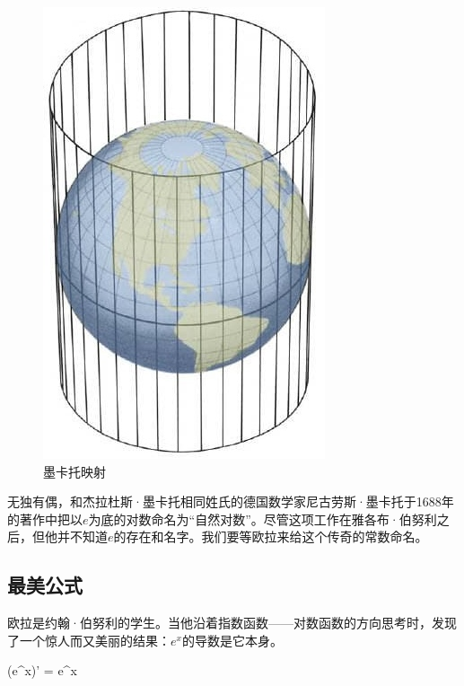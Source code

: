 \documentclass[b5paper]{ctexart}
\begin{document}
\begin{figure}[htbp]
 \centering
 \includegraphics[scale=0.3]{img/mercator-map}
 \caption{墨卡托映射}
 \label{fig:mercator}
\end{figure}

无独有偶，和杰拉杜斯·墨卡托相同姓氏的德国数学家尼古劳斯·墨卡托于1688年的著作中把以$e$为底的对数命名为“自然对数”。尽管这项工作在雅各布·伯努利之后，但他并不知道$e$的存在和名字。我们要等欧拉来给这个传奇的常数命名。

\subsection{最美公式}

欧拉是约翰·伯努利的学生。当他沿着指数函数——对数函数的方向思考时，发现了一个惊人而又美丽的结果：$e^x$的导数是它本身。

\be
(e^x)' = e^x
\ee
\end{document}
